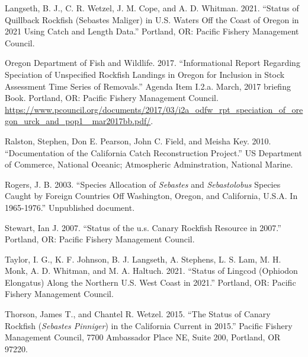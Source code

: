 \documentclass[11pt,
  english,
  letterpaper,
]{article}
\newlength{\cslhangindent}
\newenvironment{CSLReferences}[2] %
 {%
  \setlength{\parindent}{0pt}
  \ifodd #1 \everypar{\setlength{\hangindent}{\cslhangindent}}\ignorespaces\fi
  \ifnum #2 > 0
  \setlength{\parskip}{#2\baselineskip}
  \fi
 }%
 {}
\begin{document}
\begin{CSLReferences}{1}{0}
\leavevmode{}%
Langseth, B. J., C. R. Wetzel, J. M. Cope, and A. D. Whitman. 2021. {``Status of Quillback Rockfish ({S}ebastes Maliger) in {U}.{S}. Waters Off the Coast of {O}regon in 2021 Using Catch and Length Data.''} Portland, OR: Pacific Fishery Management Council.

\leavevmode{}%
Oregon Department of Fish and Wildlife. 2017. {``Informational Report Regarding Speciation of Unspecified Rockfish Landings in Oregon for Inclusion in Stock Assessment Time Series of Removals.''} Agenda Item {I}.2.a. March, 2017 briefing Book. Portland, OR: Pacific Fishery Management Council. \href{https://www.pcouncil.org/documents/2017/03/i2a_odfw_rpt_speciation_of_oregon_urck_and_pop1_\%0Amar2017bb.pdf/}{https://www.pcouncil.org/documents/2017/03/i2a\_odfw\_rpt\_speciation\_of\_oregon\_urck\_and\_pop1\_ mar2017bb.pdf/}.

\leavevmode{}%
Ralston, Stephen, Don E. Pearson, John C. Field, and Meisha Key. 2010. {``Documentation of the {California} Catch Reconstruction Project.''} US Department of Commerce, National Oceanic; Atmospheric Adminstration, National Marine.

\leavevmode{}%
Rogers, J. B. 2003. {``Species Allocation of \emph{{Sebastes}} and \emph{Sebastolobus} Species Caught by Foreign Countries Off {Washington}, {Oregon}, and {California}, {U}.{S}.{A}. In 1965-1976.''} Unpublished document.

\leavevmode{}%
Stewart, Ian J. 2007. {``Status of the u.s. Canary Rockfish Resource in 2007.''} Portland, OR: Pacific Fishery Management Council.

\leavevmode{}%
Taylor, I. G., K. F. Johnson, B. J. Langseth, A. Stephens, L. S. Lam, M. H. Monk, A. D. Whitman, and M. A. Haltuch. 2021. {``Status of Lingcod ({O}phiodon Elongatus) Along the Northern {U}.{S}. West Coast in 2021.''} Portland, OR: Pacific Fishery Management Council.

\leavevmode{}%
Thorson, James T., and Chantel R. Wetzel. 2015. {``The Status of Canary Rockfish (\emph{{Sebastes} Pinniger}) in the {California} Current in 2015.''} Pacific Fishery Management Council, 7700 Ambassador Place NE, Suite 200, Portland, OR 97220.


\end{CSLReferences}
\end{document}
